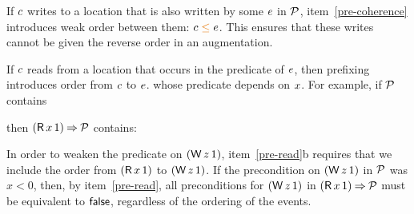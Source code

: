 If $c$ writes to a location that is also written by some $e$ in $\mathcal{P}$,
item~\ref{pre-coherence} introduces weak order between them: $\cEv \gtN \aEv$.  This
ensures that these writes cannot be given the reverse order in an augmentation.

If $c$ reads from a location that occurs in the predicate of $e$, then
prefixing introduces order from $c$ to $e$.
whose predicate depends on $x$. 
For example, if $\mathcal{P}$ contains %
\begin{tikzinline}[node distance=1em]
\end{tikzinline}
then $(\DR{x}{1})\prefix\aPSS$ contains:
\begin{displaymathsmall}
\begin{tikzcenter}[node distance=1em]
\end{tikzcenter}
\qquad{}\qquad
\begin{tikzcenter}[node distance=1em]
\end{tikzcenter}
\end{displaymathsmall}
In order to weaken the predicate on $(\DW{z}{1})$, item~\ref{pre-read}b
requires that we include the order from $(\DR{x}{1})$ to $(\DW{z}{1})$.
If the precondition on $(\DW{z}{1})$ in $\mathcal{P}$ was $x<0$, then, by
item~\ref{pre-read}, all preconditions for $(\DW{z}{1})$ in
$(\DR{x}{1})\prefix\aPSS$ must be equivalent to $\mathsf{false}$, regardless of
the ordering of the events.


